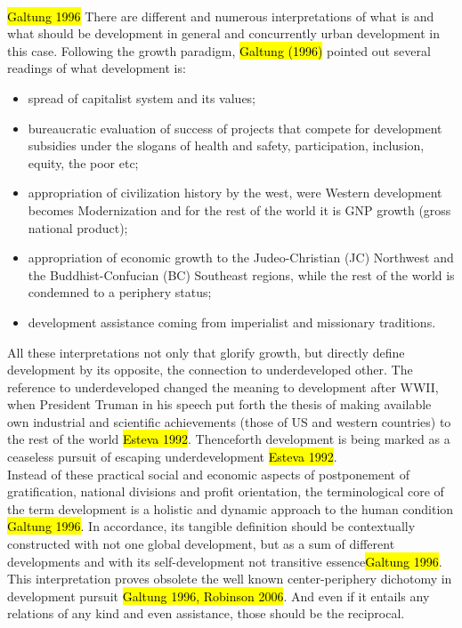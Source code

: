 \documentclass[11pt]{report}
\begin{document}
\\
\hl{Galtung 1996}
There are different and numerous interpretations of what is and what should be development in general and concurrently urban development in this case.
Following the growth paradigm, \hl{Galtung (1996)} pointed out several readings of what development is:
\begin{itemize}
\item spread of capitalist system and its values;
\item bureaucratic evaluation of success of projects that compete for development subsidies under the slogans of health and safety, participation, inclusion, equity, the poor etc;
\item appropriation of civilization history by the west, were Western  development becomes Modernization and for the rest of the world it is GNP growth (gross national product); 
\item appropriation of economic growth to the Judeo-Christian (JC) Northwest and the Buddhist-Confucian (BC) Southeast regions, while the rest of the world is  condemned to a periphery status;
\item development assistance coming from imperialist and missionary traditions.
\end{itemize}
All these interpretations not only that glorify growth, but directly define development by its opposite, the connection to underdeveloped other. The reference to underdeveloped changed the meaning to development after WWII, when President Truman in his speech put forth the thesis of making available own industrial and scientific achievements (those of US and western countries) to the rest of the world \hl{Esteva 1992}. Thenceforth development is being marked as a ceaseless pursuit of escaping underdevelopment \hl{Esteva 1992}.
\\
Instead of these practical social and economic aspects of postponement of gratification, national divisions and profit orientation, the terminological core of the term development is a holistic and dynamic approach to the human condition \hl{Galtung 1996}. 
In accordance, its tangible definition should be contextually constructed with not one global development, but as a sum of different developments and with its self-development not transitive essence\footnotemark \hl{Galtung 1996}.
This interpretation proves obsolete the well known center-periphery dichotomy in development pursuit \hl{Galtung 1996, Robinson 2006}.
And even if it entails any relations of any kind and even assistance, those should be the reciprocal.
\end{document}

